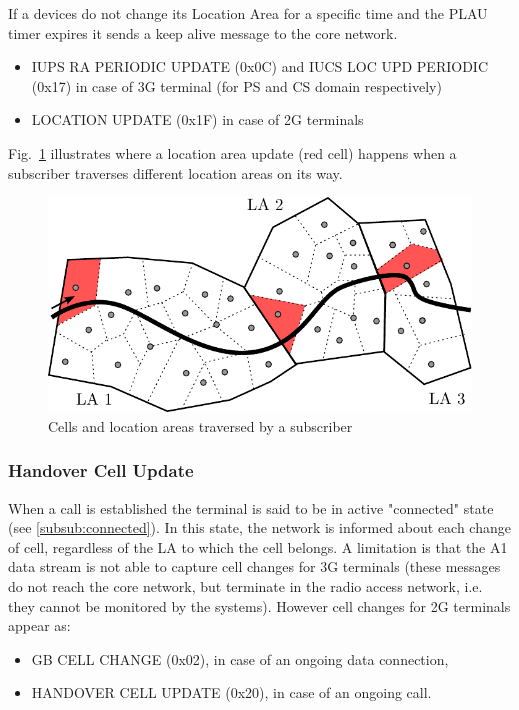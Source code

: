 If a devices do not change its Location Area for a specific time and the PLAU timer expires it sends a keep alive message to the core network.
\begin{itemize}
	\item IUPS RA PERIODIC UPDATE (0x0C) and IUCS LOC UPD PERIODIC
	      (0x17) in case of 3G terminal (for PS and CS domain respectively)
	\item LOCATION UPDATE (0x1F) in case of 2G terminals
\end{itemize}
Fig.~\ref{fig:latraversed} illustrates where a location area update (red cell) happens when a subscriber traverses different location areas on its way.
% 
\begin{figure}
	\centering
	\includegraphics[width=\linewidth]{./images/laupdate.pdf}
	\caption{Cells and location areas traversed by a subscriber} 
	\label{fig:latraversed}
\end{figure}

\subsubsection{Handover Cell Update}
When a call is established the terminal is said to be in active "connected" state (see \ref{subsub:connected}).  In this state, the network is informed about each change of
cell, regardless of the LA to which the cell belongs. A limitation is that the A1 data stream is not able to capture cell changes for 3G terminals (these messages do not reach the core network, but terminate in the radio access network,
i.e. they cannot be monitored by the systems).
However cell changes for 2G terminals appear as:
\begin{itemize}
	\item GB CELL CHANGE (0x02), in case of an ongoing data connection,
	\item HANDOVER CELL UPDATE (0x20), in case of an ongoing call.
\end{itemize}


